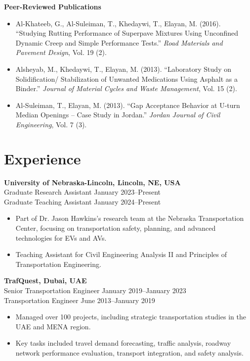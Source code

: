\documentclass[10pt, letterpaper]{article}
\begin{document}
\textbf{Peer-Reviewed Publications}
\begin{itemize}[left=0pt]
    \item Al-Khateeb, G., Al-Suleiman, T., Khedaywi, T., Elayan, M. (2016). “Studying Rutting Performance of Superpave Mixtures Using Unconfined Dynamic Creep and Simple Performance Tests.” \textit{Road Materials and Pavement Design}, Vol. 19 (2).
    \item Alsheyab, M., Khedaywi, T., Elayan, M. (2013). “Laboratory Study on Solidification/ Stabilization of Unwanted Medications Using Asphalt as a Binder.” \textit{Journal of Material Cycles and Waste Management}, Vol. 15 (2).
    \item Al-Suleiman, T., Elayan, M. (2013). “Gap Acceptance Behavior at U-turn Median Openings – Case Study in Jordan.” \textit{Jordan Journal of Civil Engineering}, Vol. 7 (3).
\end{itemize}

\section*{Experience}
\textbf{University of Nebraska-Lincoln, Lincoln, NE, USA} \\
Graduate Research Assistant \hfill January 2023–Present \\
Graduate Teaching Assistant \hfill January 2024–Present \\
\begin{itemize}[left=0pt]
    \item Part of Dr. Jason Hawkins's research team at the Nebraska Transportation Center, focusing on transportation safety, planning, and advanced technologies for EVs and AVs.
    \item Teaching Assistant for Civil Engineering Analysis II and Principles of Transportation Engineering.
\end{itemize}
\newpage
\textbf{TrafQuest, Dubai, UAE} \\
Senior Transportation Engineer \hfill January 2019–January 2023 \\
Transportation Engineer \hfill June 2013–January 2019 \\
\begin{itemize}[left=0pt]
    \item Managed over 100 projects, including strategic transportation studies in the UAE and MENA region.
    \item Key tasks included travel demand forecasting, traffic analysis, roadway network performance evaluation, transport integration, and safety analysis.
\end{itemize}
\end{document}
